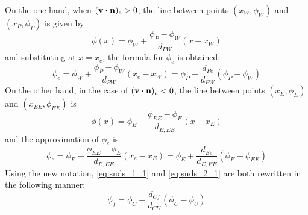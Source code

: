 \noindent
On the one hand, when $(\vb{v} \vdot \vb{n})_e > 0$, the line between points $(x_W, \phi_W)$ and $(x_P, \phi_P)$ is given by
\begin{equation}
	\phi(x) = \phi_W + \frac{\phi_P - \phi_W}{d_{PW}} (x - x_W)
\end{equation}
and substituting at $x = x_e$, the formula for $\phi_e$ is obtained:
\begin{equation} \label{eq:suds_1_1}
	\phi_e =
	\phi_W + \frac{\phi_P - \phi_W}{d_{PW}} (x_e - x_W) = 
	\phi_P + \frac{d_{Pe}}{d_{PW}} (\phi_P - \phi_W) 
\end{equation}
On the other hand, in the case of $(\vb{v} \vdot \vb{n})_e < 0$, the line between points $(x_E, \phi_E)$ and $(x_{EE}, \phi_{EE})$ is
\begin{equation}
	\phi(x) = \phi_E + \frac{\phi_{EE} - \phi_E}{d_{E,EE}} (x - x_E)
\end{equation}
and the approximation of $\phi_e$ is
\begin{equation} \label{eq:suds_2_1}
	\phi_e =
	\phi_E + \frac{\phi_{EE} - \phi_E}{d_{E,EE}} (x_e - x_E) =
	\phi_E + \frac{d_{Ee}}{d_{E,EE}} (\phi_E - \phi_{EE})	
\end{equation}
Using the new notation, \eqref{eq:suds_1_1} and \eqref{eq:suds_2_1} are both rewritten in the following manner:
\begin{equation}
	\phi_f = \phi_C + \frac{d_{Cf}}{d_{CU}} (\phi_C - \phi_U)
\end{equation}

